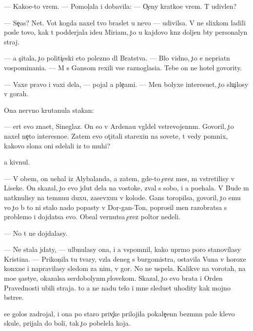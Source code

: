 \documentclass[10pt]{book}
\begin{document}
— Kako{\y}e-to vrem{\ia}. — Pomol{\c}ala i dobavila: — O{\c}eny kratko{\y}e vrem{\ia}. T{\yi} udivlen?

— Se{\y}{\c}as? Net. Vot kogda naxel tvo{\y} braslet u nevo — udivilsa. V{\yi} ne slixkom ladili posle tovo, kak t{\yi} podderjala ide{\y}u Miriam, {\c}to u kajdovo kn{\ia}z{\ia} doljen b{\yi}ty personalyn{\yi}{\y} straj.

— {\Y}a s{\c}itala, {\c}to politi{\c}eski eto polezno dl{\ia} Bratstva. — B{\yi}lo vidno, {\c}to {\y}e{\y} nepri{\y}atn{\yi} vospominani{\y}a. — M{\yi} s Gansom rexili vse raznoglasi{\y}a. Tebe on ne hotel govority.

— Vaxe pravo i vaxi dela, — pojal {\y}a ple{\c}ami. — Men{\ia} bolyxe interesu{\y}et, {\c}to slu{\c}ilosy v gorah.

Ona nervno krutanula stakan:

— {\C}ert {\y}evo zna{\y}et, Sineglaz{\yi}{\y}. On {\y}e{\x}o v Ardenau v{\yi}gl{\ia}del vstrevojenn{\yi}m. Govoril, {\c}to naxel ne{\c}to interesno{\y}e. Zatem {\y}evo ot{\c}itali stare{\y}xin{\yi} na sovete, t{\yi} vedy pomnix, kakovo slona oni sdelali iz to{\y} muhi?

{\Y}a kivnul.

— V ob{\x}em, on u{\y}ehal iz Alybalanda, a zatem, gde-to {\c}erez mes{\ia}{\q}, m{\yi} vstretilisy v Lise{\q}ke. On skazal, {\c}to {\y}evo jdut dela na vostoke, zval s sobo{\y}, i {\y}a po{\y}ehala. V Bude m{\yi} natknulisy na temnu{\y}u duxu, zasevxu{\y}u v kolod{\q}e. Gans toropilsa, govoril, {\c}to {\y}emu vo {\c}to b{\yi} to ni stalo nado popasty v Dor{\c}-gan-To{\y}n, poprosil men{\ia} razobratsa s problemo{\y} i dojdatsa {\y}evo. Obe{\x}al vernutsa {\c}erez poltor{\yi} nedeli.

— No t{\yi} ne dojdalasy.

— Ne stala jdaty, — ul{\yi}bnulasy ona, i {\y}a vspomnil, kako{\y} upr{\ia}mo{\y} poro{\y} stanovilasy Kristina. — Prikon{\c}ila tu tvary, vz{\ia}la deneg s burgomistra, ostavila V{\y}una v horoxe{\y} kon{\iu}xne i napravilasy sledom za nim, v gor{\yi}. No ne uspela. Kalikve{\q} na vorotah, na mo{\y}e s{\c}astye, okazalsa serdobolyn{\yi}m {\c}elovekom. Skazal, {\c}to {\y}evo brat{\y}a i Orden Pravednosti ubili straja. {\C}to {\y}a ne na{\y}du telo i mne sledu{\y}et uhodity kak mojno b{\yi}stre{\y}e.

{\Y}ee golos zadrojal, i ona po staro{\y} priv{\yi}{\c}ke prilojila pokale{\c}enn{\yi}{\y} bez{\yi}m{\ia}nn{\yi}{\y} pale{\q} klevo{\y} skule, prijala do boli, tak {\c}to pobelela koja.
\end{document}
